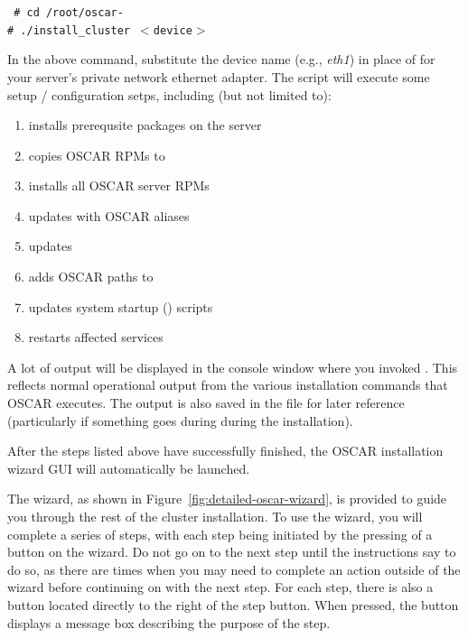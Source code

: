 \vspace{11pt}
{\tt
\# cd /root/oscar-\oscarversion \\
\indent \# ./install\_cluster $<$device$>$
}
\vspace{11pt}
  
In the above command, substitute the device name (e.g., \emph{eth1})
in place of  for your server's private network
ethernet adapter.  The script will execute some setup / configuration
setps, including (but not limited to):

\begin{enumerate}
\item installs prerequsite packages on the server
\item copies OSCAR RPMs to 
\item installs all OSCAR server RPMs
\item updates  with OSCAR aliases
\item updates  
\item adds OSCAR paths to  
\item updates system startup () scripts
\item restarts affected services
\end{enumerate}

A lot of output will be displayed in the console window where you
invoked .  This reflects normal operational
output from the various installation commands that OSCAR executes.
The output is also saved in the file  for later
reference (particularly if something goes during during the
installation).

After the steps listed above have successfully finished, the OSCAR
installation wizard GUI will automatically be launched.
  
The wizard, as shown in Figure~\ref{fig:detailed-oscar-wizard}, is
provided to guide you through the rest of the cluster installation.
To use the wizard, you will complete a series of steps, with each step
being initiated by the pressing of a button on the wizard. Do not go
on to the next step until the instructions say to do so, as there are
times when you may need to complete an action outside of the wizard
before continuing on with the next step. For each step, there is also
a  button located directly to the right of the step
button.  When pressed, the  button displays a message box
describing the purpose of the step.

